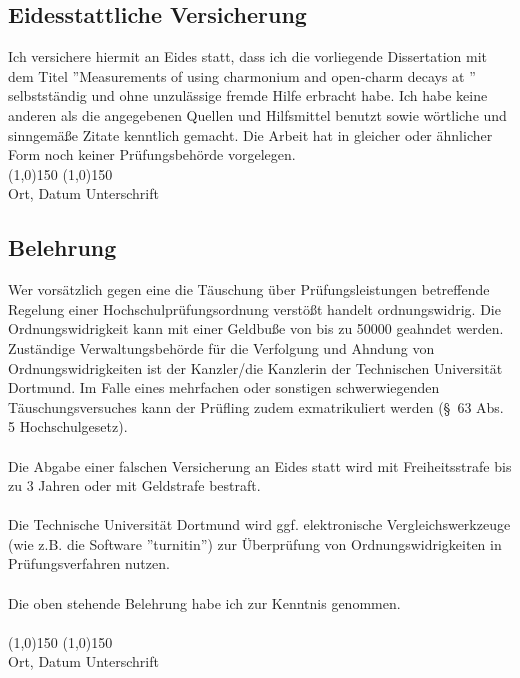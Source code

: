 
\thispagestyle{empty}
\begin{center}
\section*{Eidesstattliche Versicherung}
\end{center}
\vspace*{1cm}
Ich versichere hiermit an Eides statt, dass ich die vorliegende Dissertation mit dem Titel ''{Measurements of \sintwobeta using charmonium and open-charm decays at \lhcb}'' selbstständig und ohne unzul\"assige fremde Hilfe erbracht habe. Ich habe keine anderen als die angegebenen
Quellen und Hilfsmittel benutzt sowie w\"ortliche und sinngem\"a\ss e Zitate kenntlich gemacht.
Die Arbeit hat in gleicher oder \"ahnlicher Form noch keiner Pr\"ufungsbeh\"orde vorgelegen.
\vspace*{1cm}
\ \\
\line(1,0){150} \hfill \line(1,0){150}\\
Ort, Datum \hfill Unterschrift \hspace*{3cm}
\vspace*{1.4cm}

\subsection*{Belehrung}
Wer vors\"atzlich gegen eine die T\"auschung \"uber Pr\"ufungsleistungen betreffende Regelung einer Hochschulpr\"ufungsordnung
verst\"o\ss t handelt ordnungswidrig. Die Ordnungswidrigkeit kann mit einer Geldbu\ss e von bis zu \SI{50000}{\EUR} geahndet werden. Zust\"andige Verwaltungsbeh\"orde f\"ur die Verfolgung und Ahndung von Ordnungswidrigkeiten ist
der Kanzler/die Kanzlerin der Technischen Universit\"at Dortmund. Im Falle eines mehrfachen oder sonstigen schwerwiegenden T\"auschungsversuches kann der Pr\"ufling zudem exmatrikuliert werden (\S\ 63 Abs. 5 Hochschulgesetz).\\
\ \\
Die Abgabe einer falschen Versicherung an Eides statt wird mit Freiheitsstrafe bis zu 3 Jahren oder mit Geldstrafe bestraft.\\
\ \\
Die Technische Universit\"at Dortmund wird ggf. elektronische Vergleichswerkzeuge (wie z.B. die Software ''turnitin'') zur \"Uberpr\"ufung von Ordnungswidrigkeiten in Pr\"ufungsverfahren nutzen.\\
\ \\
Die oben stehende Belehrung habe ich zur Kenntnis genommen.
\vspace*{1cm}
\ \\
\ \\
\line(1,0){150} \hfill \line(1,0){150}\\
Ort, Datum \hfill Unterschrift \hspace*{3cm}
\vspace*{\fill}